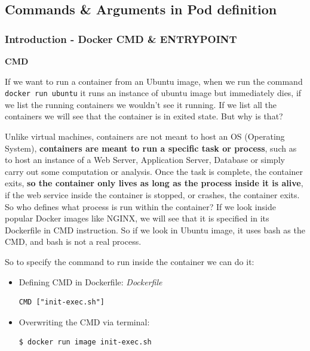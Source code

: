\documentclass{article}
\newenvironment{codetemplate}[1][]{%
  \mybasecolorbox[#1]
  \itshape
}{%
  \endmybasecolorbox
}
\begin{document}
\subsection{Commands \& Arguments in Pod definition}

\subsubsection{Introduction - Docker CMD \& ENTRYPOINT}

\textbf{CMD}

If we want to run a container from an Ubuntu image, when we run the command \verb|docker run ubuntu| it runs an instance of ubuntu image but immediately dies, if we list the running containers we wouldn't see it running. If we list all the containers we will see that the container is in exited state. But why is that?

Unlike virtual machines, containers are not meant to host an OS (Operating System), \textbf{containers are meant to run a specific task or process}, such as to host an instance of a Web Server, Application Server, Database or simply carry out some computation or analysis. Once the task is complete, the container exits, \textbf{so the container only lives as long as the process inside it is alive}, if the web service inside the container is stopped, or crashes, the container exits. So who defines what process is run within the container? If we look inside popular Docker images like NGINX, we will see that it is specified in its Dockerfile in CMD instruction. So if we look in Ubuntu image, it uses bash as the CMD, and bash is not a real process.

So to specify the command to run inside the container we can do it:

\begin{itemize}
    \item Defining CMD in Dockerfile:
\begin{codetemplate}{Dockerfile}
\begin{verbatim}
CMD ["init-exec.sh"]
\end{verbatim}
\end{codetemplate}

    \item Overwriting the CMD via terminal:
\begin{codetemplate}{}
\begin{verbatim}
$ docker run image init-exec.sh
\end{verbatim}
\end{codetemplate}
\end{itemize}
\end{document}
